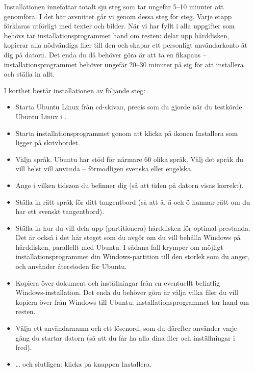 \documentclass[a4paper,final]{memoir} %
\begin{document}
Installationen innefattar totalt sju steg som tar ungefär 5--10 minuter att genomföra. I det här avsnittet går vi genom dessa steg för steg. Varje etapp förklaras utförligt med texter och bilder. När vi har fyllt i alla uppgifter som behövs tar installationsprogrammet hand om resten: delar upp hårddisken, kopierar alla nödvändiga filer till den och skapar ett personligt användarkonto åt dig på datorn. Det enda du då behöver göra är att ta en fikapaus -- installationsprogrammet behöver ungefär 20--30 minuter på sig för att installera och ställa in allt.



I korthet består installationen av följande steg:

\begin{itemize}

\item Starta Ubuntu Linux från cd-skivan, precis som du gjorde när du testkörde Ubuntu Linux i .
\item Starta installationsprogrammet genom att klicka på ikonen Installera som ligger på skrivbordet.
\item Välja språk. Ubuntu har stöd för närmare 60 olika språk. Välj det språk du vill helst vill använda -- förmodligen svenska eller engelska.
\item Ange i vilken tidszon du befinner dig (så att tiden på datorn visas korrekt).
\item Ställa in rätt språk för ditt tangentbord (så att å, ä och ö hamnar rätt om du har ett svenskt tangentbord).
\item Ställa in hur du vill dela upp (partitionera) hårddisken för optimal prestanda. Det är också i det här steget som du avgör om du vill behålla Windows på hårddisken, parallellt med Ubuntu. I sådana fall krymper om möjligt installationsprogrammet din Windows-partition till den storlek som du anger, och använder återstoden för Ubuntu.
\item Kopiera över dokument och inställningar från en eventuellt befintlig Windows-installation. Det enda du behöver göra är välja vilka filer du vill kopiera över från Windows till Ubuntu, installationsprogrammet tar hand om resten.
\item Välja ett användarnamn och ett lösenord, som du därefter använder varje gång du startar datorn (så att du får ha alla dina filer och inställningar i fred).
\item \ldots{} och slutligen: klicka på knappen Installera.


\end{itemize}
\end{document}
